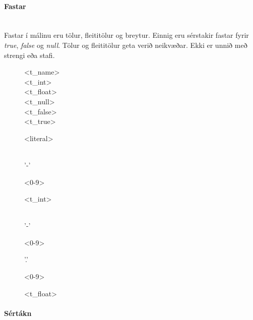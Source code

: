 \documentclass{article}
\begin{document}
\clearpage
\paragraph{Fastar} ~\\

Fastar í málinu eru tölur, fleititölur og breytur. Einnig eru sérstakir fastar fyrir \emph{true}, \emph{false} og \emph{null}.
Tölur og fleititölur geta verið neikvæðar. Ekki er unnið með strengi eða stafi.

\begin{figure}[h!]
	\begin{syntdiag}
	\begin{stack}
		<t_name> \\ <t_int> \\ <t_float> \\ <t_null> \\ <t_false> \\ <t_true>
	\end{stack}
	\end{syntdiag}
	\caption{{\textless}literal{\textgreater}}
\end{figure}

\begin{figure}[h!]
	\begin{syntdiag}
	\begin{stack} \\
		'-' 
	\end{stack}
	\begin{rep}
		<0-9>
	\end{rep}
	\end{syntdiag}
	\caption{{\textless}t_int{\textgreater}}
\end{figure}

\begin{figure}[h!]
	\begin{syntdiag}
	\begin{stack} \\
		'-' 
	\end{stack}
	\begin{rep}
		<0-9>
	\end{rep}
	'.'
	\begin{rep}
		<0-9>
	\end{rep}
	\end{syntdiag}
	\caption{{\textless}t_float{\textgreater}}
\end{figure}

\paragraph{Sértákn} ~\\
\end{document}
